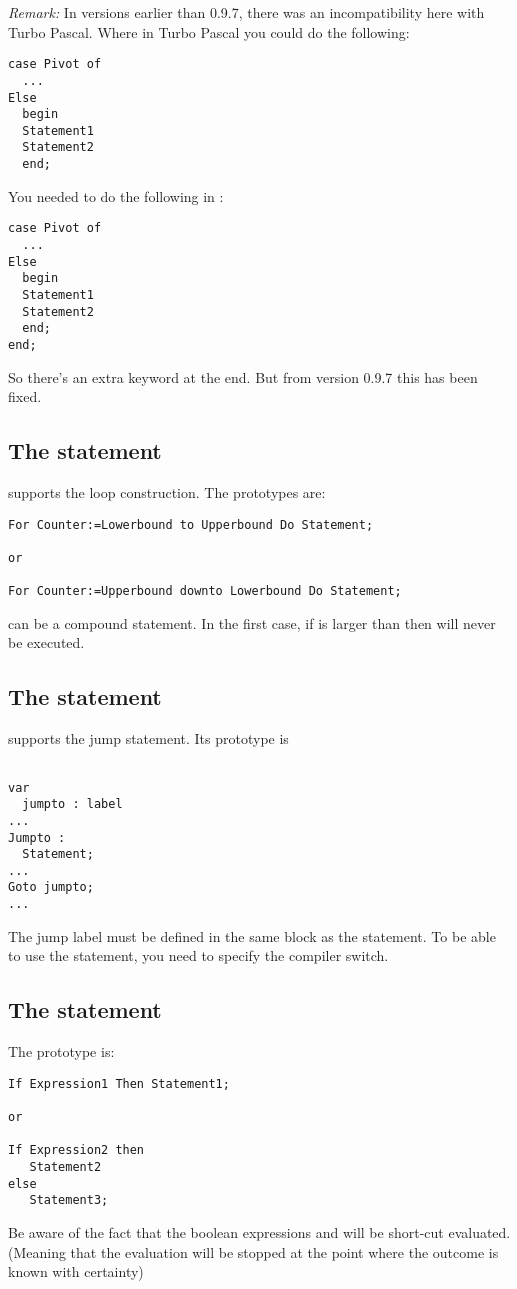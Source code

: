 \documentclass{report}
\begin{document}
{\em Remark:} In versions earlier than 0.9.7, there was an incompatibility here 
with Turbo Pascal. Where in Turbo Pascal you could do the following:
\begin{verbatim}
case Pivot of
  ...
Else
  begin
  Statement1
  Statement2
  end;
\end{verbatim}
You needed to do the following in \fpc :
\begin{verbatim}
case Pivot of
  ...
Else
  begin
  Statement1
  Statement2
  end;
end;
\end{verbatim}
So there's an extra  keyword at the end. But from version 0.9.7
this has been fixed.
\subsection{The  statement}
\fpc supports the  loop construction. The prototypes are:
\begin{verbatim}
For Counter:=Lowerbound to Upperbound Do Statement;

or 

For Counter:=Upperbound downto Lowerbound Do Statement;
\end{verbatim}
 can be a compound statement. In the first case, if
 is larger than  then  will
never be executed.
\subsection{The  statement}
\fpc supports the  jump statement. Its prototype is
\begin{verbatim}

var
  jumpto : label
...
Jumpto : 
  Statement;
...
Goto jumpto;
...
\end{verbatim}
The jump label must be defined in the same block as the 
statement.
To be able to use the  statement, you need to specify the 
compiler switch.
\subsection{The  statement}
The  prototype is:
\begin{verbatim}
If Expression1 Then Statement1;

or 

If Expression2 then 
   Statement2
else
   Statement3;
\end{verbatim}
Be aware of the fact that the boolean expressions  and
 will be short-cut evaluated. (Meaning that the evaluation
will be stopped at the point where the outcome is known with certainty)
\end{document}
